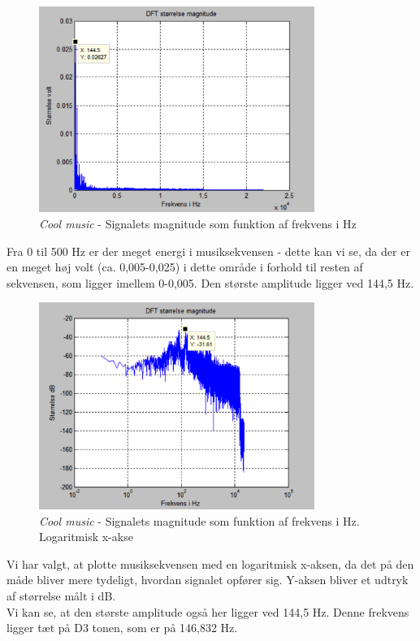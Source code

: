 \begin{figure}[H]
	\centering
	\includegraphics[width=0.8\textwidth]{Figurer/Snip20151001_7}
	\caption{\textit{Cool music} - Signalets magnitude som funktion af frekvens i Hz}
\end{figure}

Fra 0 til 500 Hz er der meget energi i musiksekvensen - dette kan vi se, da der er en meget høj volt (ca. 0,005-0,025) i dette område i forhold til resten af sekvensen, som ligger imellem 0-0,005. Den største amplitude ligger ved 144,5 Hz.      

\begin{figure}[H]
	\centering
	\includegraphics[width=0.8\textwidth]{Figurer/Snip20151001_8}
	\caption{\textit{Cool music} - Signalets magnitude som funktion af frekvens i Hz. Logaritmisk x-akse}
\end{figure}  

Vi har valgt, at plotte musiksekvensen med en logaritmisk x-aksen, da det på den måde bliver mere tydeligt, hvordan signalet opfører sig. Y-aksen bliver et udtryk af størrelse målt i dB. \\
Vi kan se, at den største amplitude også her ligger ved 144,5 Hz. Denne frekvens ligger tæt på D3 tonen, som er på 146,832 Hz.      


